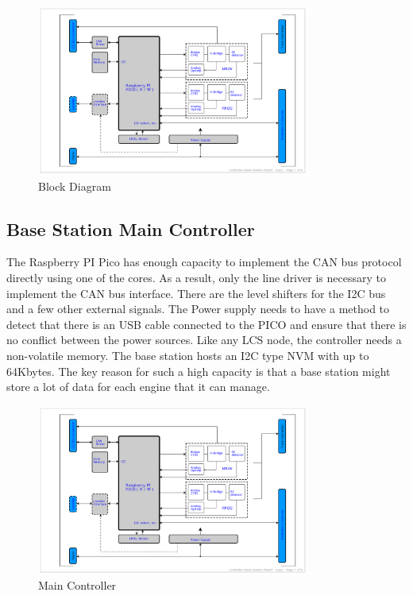 \begin{figure}[htbp]
    \centering
    \includegraphics[page=1, width=0.8\textwidth]{./Schematics/Schematic_LcsNodes-Base-Station-Board.pdf}
    \caption{Block Diagram}
\end{figure}
\FloatBarrier

\subsection{Base Station Main Controller}

The Raspberry PI Pico has enough capacity to implement the CAN bus protocol directly using one of the cores. As a result, only the line driver is necessary to implement the CAN bus interface. There are the level shifters for the I2C bus and a few other external signals. The Power supply needs to have a method to detect that there is an USB cable connected to the PICO and ensure that there is no conflict between the power sources. Like any LCS node, the controller needs a non-volatile memory. The base station hosts an I2C type NVM with up to 64Kbytes. The key reason for such a high capacity is that a base station might store a lot of data for each engine that it can manage.

\begin{figure}[htbp]
    \centering
    \includegraphics[page=2, width=0.8\textwidth]{./Schematics/Schematic_LcsNodes-Base-Station-Board.pdf}
    \caption{Main Controller}
\end{figure}
\FloatBarrier

